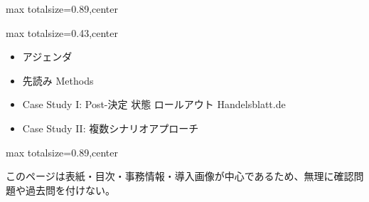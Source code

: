 \begin{minipage}[t]{0.58\textwidth}
\begin{adjustbox}{max totalsize={\textwidth}{0.89\textheight},center}
\begin{minipage}{\textwidth}
\end{minipage}
\end{adjustbox}
\end{minipage}


\clearpage
{}
\begin{minipage}[t]{0.405\textwidth}
\begin{adjustbox}{max totalsize={\textwidth}{0.43\textheight},center}
\begin{minipage}{\textwidth}\scriptsize
{}\begin{itemize}
\item アジェンダ
\item 先読み Methods
\item Case Study I: Post-決定 状態 ロールアウト Handelsblatt.de
\item Case Study II: 複数シナリオアプローチ
\end{itemize}
\end{minipage}
\end{adjustbox}
\end{minipage}\hfill
\begin{minipage}[t]{0.58\textwidth}
\begin{adjustbox}{max totalsize={\textwidth}{0.89\textheight},center}
\begin{minipage}{\textwidth}\scriptsize
{}このページは表紙・目次・事務情報・導入画像が中心であるため、無理に確認問題や過去問を付けない。
\end{minipage}
\end{adjustbox}
\end{minipage}


